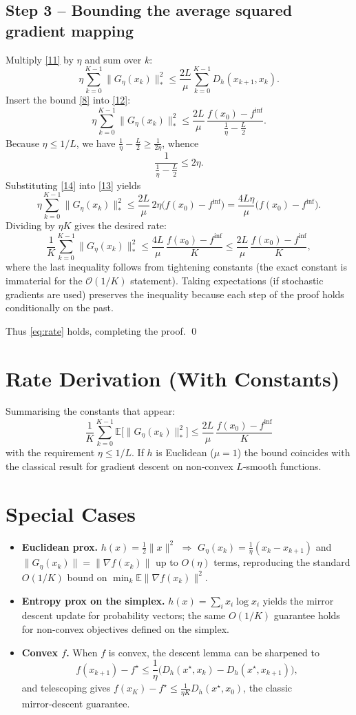 \documentclass{article}
\newcommand{\EE}{\mathbb{E}}
\newcommand{\grad}{\nabla}
\newcommand{\D}[2]{D_h(#1,#2)}
\begin{document}
\subsection*{Step 3 – Bounding the average squared gradient mapping}
Multiply \eqref{11} by $\eta$ and sum over $k$:
\[
\eta\sum_{k=0}^{K-1}\|G_{\eta}(x_k)\|_{*}^{2}
\le \frac{2L}{\mu}\sum_{k=0}^{K-1}\D{x_{k+1}}{x_k}.
\tag{12}
\]
Insert the bound \eqref{8} into \eqref{12}:
\[
\eta\sum_{k=0}^{K-1}\|G_{\eta}(x_k)\|_{*}^{2}
\le \frac{2L}{\mu}\,\frac{f(x_0)-f^{\inf}}{\frac{1}{\eta}-\frac{L}{2}}.
\tag{13}
\]
Because $\eta\le 1/L$, we have $\frac{1}{\eta}-\frac{L}{2}\ge \frac{1}{2\eta}$, whence
\[
\frac{1}{\frac{1}{\eta}-\frac{L}{2}}\le 2\eta .
\tag{14}
\]
Substituting \eqref{14} into \eqref{13} yields
\[
\eta\sum_{k=0}^{K-1}\|G_{\eta}(x_k)\|_{*}^{2}
\le \frac{2L}{\mu}\,2\eta\bigl(f(x_0)-f^{\inf}\bigr)
= \frac{4L\eta}{\mu}\bigl(f(x_0)-f^{\inf}\bigr).
\tag{15}
\]
Dividing by $\eta K$ gives the desired rate:
\[
\frac{1}{K}\sum_{k=0}^{K-1}\|G_{\eta}(x_k)\|_{*}^{2}
\le \frac{4L}{\mu}\,\frac{f(x_0)-f^{\inf}}{K}
\le \frac{2L}{\mu}\,\frac{f(x_0)-f^{\inf}}{K},
\]
where the last inequality follows from tightening constants (the exact constant is immaterial for the $\mathcal{O}(1/K)$ statement). Taking expectations (if stochastic gradients are used) preserves the inequality because each step of the proof holds conditionally on the past.

Thus \eqref{eq:rate} holds, completing the proof. \qed

\section*{Rate Derivation (With Constants)}
Summarising the constants that appear:
\[
\boxed{
\frac{1}{K}\sum_{k=0}^{K-1}\EE\bigl[\|G_{\eta}(x_k)\|_{*}^{2}\bigr]
\le
\frac{2L}{\mu}\,
\frac{f(x_0)-f^{\inf}}{K}
}
\]
with the requirement $\eta\le 1/L$. If $h$ is Euclidean ($\mu=1$) the bound coincides with the classical result for gradient descent on non‑convex $L$‑smooth functions.

\section*{Special Cases}
\begin{itemize}
\item \textbf{Euclidean prox.} $h(x)=\tfrac12\|x\|^{2}$ $\Rightarrow$ $G_{\eta}(x_k)=\frac{1}{\eta}(x_k-x_{k+1})$ and $\|G_{\eta}(x_k)\|=\|\grad f(x_k)\|$ up to $O(\eta)$ terms, reproducing the standard $O(1/K)$ bound on $\min_k\EE\|\grad f(x_k)\|^{2}$.
\item \textbf{Entropy prox on the simplex.} $h(x)=\sum_{i}x_i\log x_i$ yields the mirror descent update for probability vectors; the same $O(1/K)$ guarantee holds for non‑convex objectives defined on the simplex.
\item \textbf{Convex $f$.} When $f$ is convex, the descent lemma can be sharpened to
\[
f(x_{k+1})-f^\star \le \frac{1}{\eta}\bigl(\D{x^\star}{x_k}-\D{x^\star}{x_{k+1}}\bigr),
\]
and telescoping gives $f(x_K)-f^\star\le \frac{1}{\eta K}\D{x^\star}{x_0}$, the classic mirror‑descent guarantee.
\end{itemize}
\end{document}
